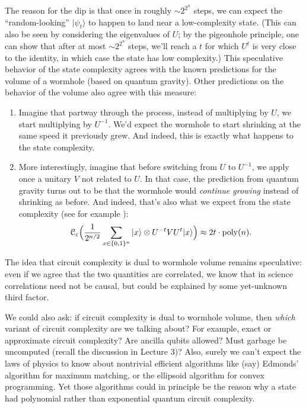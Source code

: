 \documentclass[11pt]{report}
\theoremstyle{plain}
\theoremstyle{definition}
\newcommand{\poly}{\operatorname{poly}}
\newcommand{\eps}{\varepsilon}
\renewcommand{\ket}[1]{|#1\rangle}
\begin{document}
The reason for the dip is that once in roughly $\sim 2^{2^n}$ steps, we can expect the ``random-looking'' $\ket{\psi_t}$ to happen to land near a low-complexity state.  (This can also be seen by considering the eigenvalues of $U$; by the pigeonhole principle, one can show that after at most $\sim 2^{2^n}$ steps, we'll reach a $t$ for which $U^t$ is very close to the identity, in which case the state has low complexity.)  This speculative behavior of the state complexity agrees with the known predictions for the volume of a wormhole (based on quantum gravity). Other predictions on the behavior of the volume also agree with this measure:
\begin{enumerate}
    \item Imagine that partway through the process, instead of multiplying by $U$, we start multiplying by $U^{-1}$. We'd expect the wormhole to start shrinking at the same speed it previously grew. And indeed, this is exactly what happens to the state complexity.
    \item More interestingly, imagine that before switching from $U$ to $U^{-1}$, we apply once a unitary $V$ not related to $U$. In that case, the prediction from quantum gravity turns out to be that the wormhole would \emph{continue growing} instead of shrinking as before. And indeed, that's also what we expect from the state complexity (see for example \cite{SS14}):
\[
{\cal C}_\eps\Big(\frac{1}{2^{n/2}} \sum_{x \in \{0,1\}^n} \ket{x} \otimes U^{-t} V U^t \ket{x} \Big) \approx 2t \cdot \poly(n).
\]
\end{enumerate}

The idea that circuit complexity is dual to wormhole volume remains speculative: even if we agree that the two quantities are correlated, we know that in science correlations need not be causal, but could be explained by some yet-unknown third factor.

We could also ask: if circuit complexity is dual to wormhole volume, then {\em which} variant of circuit complexity are we talking about?  For example, exact or approximate circuit complexity?  Are ancilla qubits allowed?  Must garbage be uncomputed (recall the discussion in Lecture 3)?  Also, surely we can't expect the laws of physics to know about nontrivial efficient algorithms like (say) Edmonds' algorithm for maximum matching, or the ellipsoid algorithm for convex programming.  Yet those algorithms could in principle be the reason why a state had polynomial rather than exponential quantum circuit complexity.
\end{document}
